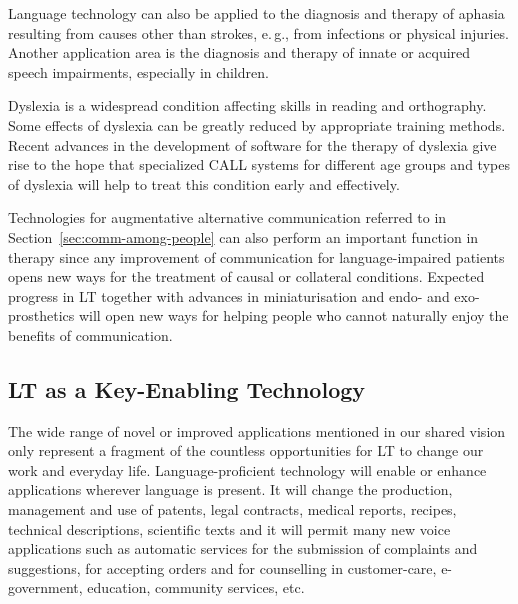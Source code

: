 \documentclass[10pt, plain]{../../metanetpaper}
\begin{document}
\begin{multicols}{2}
Language technology can also be applied to the diagnosis and therapy of aphasia resulting from causes other than strokes, e.\,g., from infections or physical injuries. Another application area is the diagnosis and therapy of innate or acquired speech impairments, especially in children. 
 
Dyslexia is a widespread condition affecting skills in reading and orthography. Some effects of dyslexia can be greatly reduced by appropriate training methods. Recent advances in the development of software for the therapy of dyslexia give rise to the hope that specialized CALL systems for different age groups and types of dyslexia will help to treat this condition early and effectively.
 
Technologies for augmentative alternative communication referred to in Section~\ref{sec:comm-among-people} can also perform an important function in therapy since any improvement of communication for language-impaired patients opens new ways for the treatment of causal or collateral conditions. Expected progress in LT together with advances in miniaturisation and endo- and exo-prosthetics will open new ways for helping people who cannot naturally enjoy the benefits of communication.

\subsection[Language Technology as a Key-Enabling Technology]{LT as a Key-Enabling Technology}
\label{sec:lang-techn-as-key-enabling-technology}


The wide range of novel or improved applications mentioned in our shared vision only represent a fragment of the countless opportunities for LT to change our work and everyday life. Language-proficient technology will enable or enhance applications wherever language is present. It will change the production, management and use of patents, legal contracts, medical reports, recipes, technical descriptions, scientific texts and it will permit many new voice applications such as automatic services for the submission of complaints and suggestions, for accepting orders and for counselling in customer-care, e-government, education, community services, etc.   


\end{multicols}
\end{document}
